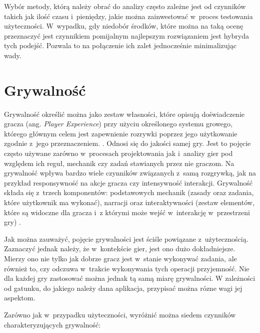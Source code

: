 \documentclass[a4paper,12pt,numbers=noenddot]{report}
\begin{document}
Wybór metody, którą należy obrać do analizy często zależne jest od czynników takich jak ilość czasu i~pieniędzy, jakie można zainwestować w~proces testowania użyteczności. W~wypadku, gdy niedobór środków, które można na taką ocenę przeznaczyć jest czynnikiem pomijalnym najlepszym rozwiązaniem jest hybryda tych podejść. Pozwala to na połączenie ich zalet jednocześnie minimalizując wady.

\section{Grywalność}
Grywalność określić można jako zestaw własności, które opisują doświadczenie gracza (ang. \textit{Player Experience}) przy użyciu określonego systemu growego, którego głównym celem jest zapewnienie rozrywki poprzez jego użytkowanie zgodnie z~jego przeznaczeniem. \cite{art_Playability}. Odnosi się do jakości samej gry. Jest to pojęcie często używane zarówno w~procesach projektowania jak i~analizy gier pod względem ich reguł, mechanik czy zadań stawianych przez nie graczom. Na grywalność wpływa bardzo wiele czynników związanych z~samą rozgrywką, jak na przykład responsywność na akcje gracza czy intensywność interakcji.
Grywalność składa się z~trzech komponentów: podstawowych mechanik (zasady oraz zadania, które użytkownik ma wykonać), narracji oraz interaktywności (zestaw elementów, które są widoczne dla gracza i~z którymi może wejść w~interakcję w~przestrzeni gry) \cite{art_UserExperience}.

Jak można zauważyć, pojęcie grywalności jest ściśle powiązane z~użytecznością. Zaznaczyć jednak należy, że w~kontekście gier, jest ono dużo dokładniejsze. Mierzy ono nie tylko jak dobrze gracz jest w~stanie wykonywać zadania, ale również to, czy odczuwa w~trakcie wykonywania tych operacji przyjemność. Nie dla każdej gry zastosować można jednak tą samą miarę grywalności. W zależności od gatunku, do jakiego należy dana aplikacja, przypisać można rózne wagi jej aspektom.

Zarówno jak w~przypadku użyteczności, wyróżnić można siedem czynników charakteryzujących grywalność:
\end{document}
